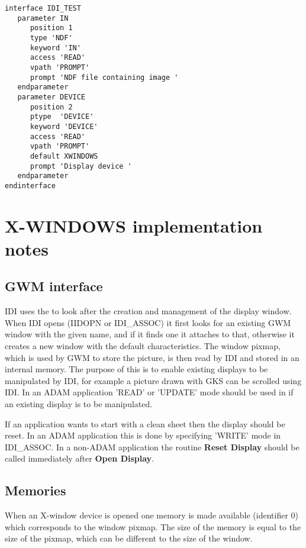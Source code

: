 \newpage
\begin{small}
\begin{verbatim}
interface IDI_TEST
   parameter IN
      position 1
      type 'NDF'
      keyword 'IN'
      access 'READ'
      vpath 'PROMPT'
      prompt 'NDF file containing image '
   endparameter
   parameter DEVICE
      position 2
      ptype  'DEVICE'
      keyword 'DEVICE'
      access 'READ'
      vpath 'PROMPT'
      default XWINDOWS
      prompt 'Display device '
   endparameter
endinterface
\end{verbatim}
\end{small}
      
\newpage
\section{X-WINDOWS implementation notes}
\label{se:xin}

\subsection{GWM interface}

IDI uses the  to look after the creation
and management of the display window. When IDI opens (IIDOPN or IDI\_ASSOC)
it first looks for an existing GWM window with the given name, and if
it finds one it attaches to that, otherwise it creates a new window with
the default characteristics. The window pixmap, which is used by GWM to
store the picture, is then read by IDI and stored in an internal memory.
The purpose of this is to enable existing displays to be manipulated by
IDI, for example a picture drawn with GKS can be scrolled using IDI.
In an ADAM application 'READ' or 'UPDATE' mode should be used in
 if an existing display is to be manipulated.

If an application wants to start with a clean sheet then the display
should be reset. In an ADAM application this is done by specifying
'WRITE' mode in IDI\_ASSOC. In a non-ADAM application the routine
{\bf Reset Display} should be called immediately after {\bf Open
Display}.

\subsection{Memories}

When an X-window device is opened one memory is made available
(identifier 0) which corresponds to the window pixmap. The size of the
memory is equal to the size of the pixmap, which can be different to
the size of the window.


